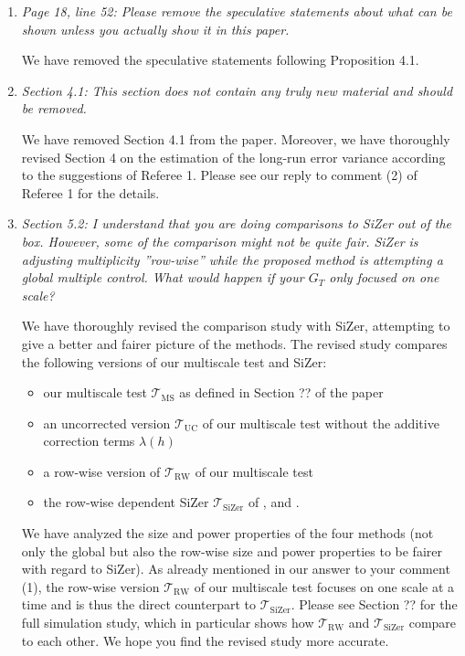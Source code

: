 \documentclass[a4paper,12pt]{article}
\begin{document}
\begin{enumerate}[label=(\arabic*),leftmargin=0.8cm]
\item \textit{Page 18, line 52: Please remove the speculative statements about what can be shown unless you actually show it in this paper.}

We have removed the speculative statements following Proposition 4.1.


\item \textit{Section 4.1: This section does not contain any truly new material and should be removed.}

We have removed Section 4.1 from the paper. Moreover, we have thoroughly revised Section 4 on the estimation of the long-run error variance according to the suggestions of Referee 1. Please see our reply to comment (2) of Referee 1 for the details. 


\item \textit{Section 5.2: I understand that you are doing comparisons to SiZer out of the box. However, some of the comparison might not be quite fair. SiZer is adjusting multiplicity ”row-wise” while the proposed method is attempting a global multiple control. What would happen if your $G_T$ only focused on one scale?}

We have thoroughly revised the comparison study with SiZer, attempting to give a better and fairer picture of the methods. The revised study compares the following versions of our multiscale test and SiZer: 
\begin{itemize}[leftmargin=0.5cm,itemsep=0cm]

\item our multiscale test $\mathcal{T}_{\text{MS}}$ as defined in Section ?? of the paper 
\item an uncorrected version $\mathcal{T}_{\text{UC}}$ of our multiscale test without the additive correction terms $\lambda(h)$ 
\item a row-wise version of $\mathcal{T}_{\text{RW}}$ of our multiscale test 
\item the row-wise dependent SiZer $\mathcal{T}_{\text{SiZer}}$ of \cite{Rondonotti2004}, \cite{Rondonotti2007} and \cite{ParkHannigKang2009}. 

\end{itemize}
We have analyzed the size and power properties of the four methods (not only the global but also the row-wise size and power properties to be fairer with regard to SiZer). As already mentioned in our answer to your comment (1), the row-wise version $\mathcal{T}_{\text{RW}}$ of our multiscale test focuses on one scale at a time and is thus the direct counterpart to $\mathcal{T}_{\text{SiZer}}$. Please see Section ?? for the full simulation study, which in particular shows how $\mathcal{T}_{\text{RW}}$ and $\mathcal{T}_{\text{SiZer}}$ compare to each other. We hope you find the revised study more accurate.



\end{enumerate}
\end{document}
